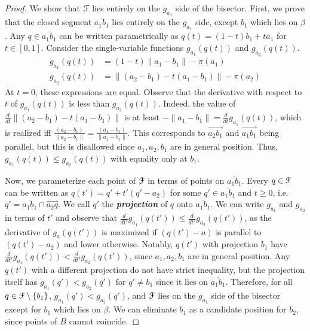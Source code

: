 \documentclass[a4paper,UKenglish]{socg-lipics-v2018}
\def\norm#1{\mathopen\| #1 \mathclose\|}	%
\theoremstyle{plain}
\numberwithin{figure}{section}
\def\EMPH#1{\textbf{\emph{\boldmath #1}}}
\begin{document}
\begin{toappendix}
\begin{proof}
We show that $\EuScript{F}$ lies entirely on the $g_{a_1}$ side of the
bisector.
First, we prove that the closed segment $\overline{a_1 b_1}$ lies entirely on
the $g_{a_1}$ side, except $b_1$ which lies on $\beta$.
Any $q \in \overline{a_1 b_1}$ can be written parametrically as
$q(t) = (1-t) b_1 + t a_1$ for $t \in [0,1]$.
Consider the single-variable functions $g_{a_1}(q(t))$ and $g_{a_2}(q(t))$.
\begin{equation*}
\begin{aligned}
	g_{a_1}(q(t)) &= (1-t)\norm{a_1 - b_1} - \pi(a_1) \\
	g_{a_2}(q(t)) &= \norm{(a_2 - b_1) - t(a_1 - b_1)} - \pi(a_2)
\end{aligned}
\end{equation*}
At $t=0$, these expressions are equal.
Observe that the derivative with respect to $t$ of $g_{a_1}(q(t))$ is less than
$g_{a_2}(q(t))$.
Indeed, the value of $\frac{d}{dt}\norm{(a_2 - b_1) - t(a_1 - b_1)}$ is at
least $-\norm{a_1 - b_1} = \frac{d}{dt}g_{a_1}(q(t))$, which is realized iff
$\frac{(a_2 - b_1)}{\norm{a_2 - b_1}} = \frac{(a_1 - b_1)}{\norm{a_1 - b_1}}$.
This corresponds to $\overrightarrow{a_2 b_1}$ and $\overrightarrow{a_1 b_1}$
being parallel, but this is disallowed since $a_1, a_2, b_1$ are in general
position.
Thus, $g_{a_1}(q(t)) \leq g_{a_2}(q(t))$ with equality only at $b_1$.

Now, we parameterize each point of $\EuScript{F}$ in terms of points on
$\overline{a_1 b_1}$.
Every $q \in \EuScript{F}$ can be written as $q(t') = q' + t'(q' - a_2)$ for
some $q' \in \overline{a_1 b_1}$ and $t \geq 0$, i.e.
$q' = \overline{a_1 b_1} \cap \overrightarrow{a_2 q}$.
We call $q'$ the \EMPH{projection} of $q$ onto $\overline{a_1 b_1}$.
We can write $g_{a_1}$ and $g_{a_2}$ in terms of $t'$ and observe that
$\frac{d}{dt'}g_{a_1}(q(t')) \leq \frac{d}{dt'}g_{a_2}(q(t'))$, as the
derivative of $g_a(q(t'))$ is maximized if $(q(t') - a)$ is parallel to
$(q(t') - a_2)$ and lower otherwise.
Notably, $q(t')$ with projection $b_1$ have
$\frac{d}{dt'}g_{a_1}(q(t')) < \frac{d}{dt'}g_{a_2}(q(t'))$, since
$a_1, a_2, b_1$ are in general position.
Any $q(t')$ with a different projection do not have strict inequality, but
the projection itself has $g_{a_1}(q') < g_{a_2}(q')$ for $q' \neq b_1$ since
it lies on $\overline{a_1 b_1}$.
Therefore, for all $q \in \EuScript{F} \setminus\{b_1\}$,
$g_{a_1}(q') < g_{a_2}(q')$, and $\EuScript{F}$ lies on the $g_{a_1}$ side of
the bisector except for $b_1$ which lies on $\beta$.
We can eliminate $b_1$ as a candidate position for $b_2$, since points of $B$
cannot coincide.


\end{proof}
\end{toappendix}
\end{document}
